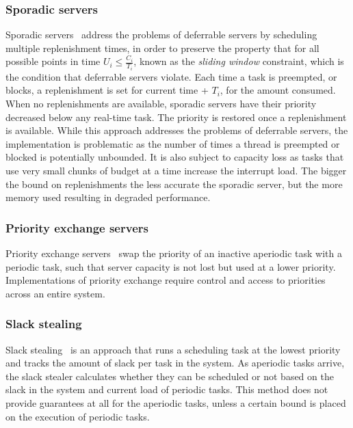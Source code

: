\subsubsection{Sporadic servers}
\label{p:sporadic} 

Sporadic servers~\citep{Sprunt_SL_89a} address the problems of
deferrable servers by scheduling multiple replenishment times, in order to preserve the property
that for all possible points in time $U_{i} \leq \frac{C_{i}}{T_{i}}$, known as the \emph{sliding window} constraint, which
is the condition that deferrable servers violate.  Each time a task is preempted, or blocks, a
replenishment is set for current time + $T_{i}$, for the amount consumed.  When no replenishments are
available, sporadic servers have their priority decreased below any real-time task.  The priority is
restored once a replenishment is available.  While this approach addresses the problems of deferrable
servers, the implementation is problematic as the number of times a thread is preempted or blocked
is potentially unbounded.  It is also subject to capacity loss as tasks that use very small chunks
of budget at a time increase the interrupt load.  The bigger the bound on replenishments the less
accurate the sporadic server, but the more memory used resulting in degraded performance.

\subsubsection{Priority exchange servers}

Priority exchange servers~\citep{Sprunt_SL_89a} swap the priority of an inactive
aperiodic task with a periodic task, such that server capacity is not lost but used at a lower
priority.  Implementations of priority exchange require control and access to priorities across an
entire system.

\subsubsection{Slack stealing}

Slack stealing~\citep{Ramos_Thuel_Lehoczky_93} is an approach that runs a scheduling
task at the lowest priority and tracks the amount of slack per task in the system.  As aperiodic
tasks arrive, the slack stealer calculates whether they can be scheduled or not based on the slack
in the system and current load of periodic tasks.  This method does not provide guarantees at all
for the aperiodic tasks, unless a certain bound is placed on the execution of periodic tasks.

